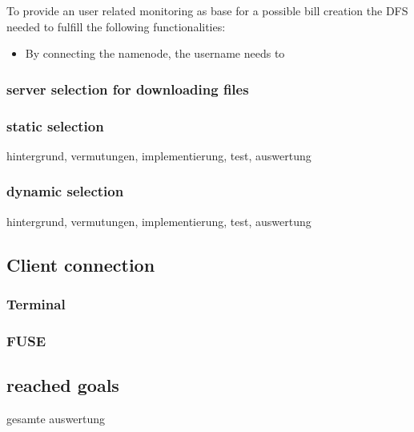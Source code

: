 To provide an user related monitoring as base for a possible bill creation the DFS needed to fulfill the following functionalities:

\begin{itemize}
\item By connecting the namenode, the username needs to 
\end{itemize}

\subsubsection{server selection for downloading files}

\subsubsection{static selection}

hintergrund, vermutungen, implementierung, test, auswertung

\subsubsection{dynamic selection}

hintergrund, vermutungen, implementierung, test, auswertung

\subsection{Client connection}
\subsubsection{Terminal}
\subsubsection{FUSE}

\subsection{reached goals}
gesamte auswertung





